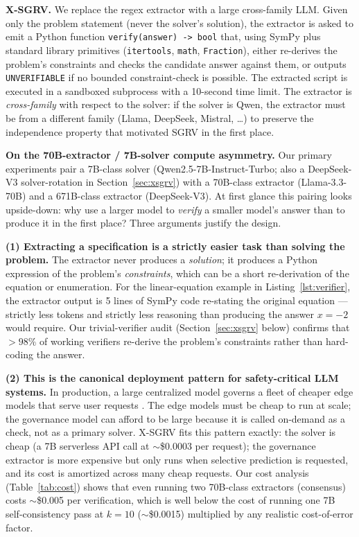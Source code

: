 \documentclass{article}
\begin{document}
\textbf{X-SGRV.} We replace the regex extractor with a large cross-family LLM. Given only the problem statement (never the solver's solution), the extractor is asked to emit a Python function \texttt{verify(answer) -> bool} that, using SymPy plus standard library primitives (\texttt{itertools}, \texttt{math}, \texttt{Fraction}), either re-derives the problem's constraints and checks the candidate answer against them, or outputs \texttt{UNVERIFIABLE} if no bounded constraint-check is possible. The extracted script is executed in a sandboxed subprocess with a 10-second time limit. The extractor is \emph{cross-family} with respect to the solver: if the solver is Qwen, the extractor must be from a different family (Llama, DeepSeek, Mistral, \ldots) to preserve the independence property that motivated SGRV in the first place.

\textbf{On the 70B-extractor / 7B-solver compute asymmetry.} Our primary experiments pair a 7B-class solver (Qwen2.5-7B-Instruct-Turbo; also a DeepSeek-V3 solver-rotation in Section~\ref{sec:xsgrv}) with a 70B-class extractor (Llama-3.3-70B) and a 671B-class extractor (DeepSeek-V3). At first glance this pairing looks upside-down: why use a larger model to \emph{verify} a smaller model's answer than to produce it in the first place? Three arguments justify the design.

\textbf{(1) Extracting a specification is a strictly easier task than solving the problem.} The extractor never produces a \emph{solution}; it produces a Python expression of the problem's \emph{constraints}, which can be a short re-derivation of the equation or enumeration. For the linear-equation example in Listing~\ref{lst:verifier}, the extractor output is 5 lines of SymPy code re-stating the original equation --- strictly less tokens and strictly less reasoning than producing the answer $x{=}-2$ would require. Our trivial-verifier audit (Section~\ref{sec:xsgrv} below) confirms that $>98\%$ of working verifiers re-derive the problem's constraints rather than hard-coding the answer.

\textbf{(2) This is the canonical deployment pattern for safety-critical LLM systems.} In production, a large centralized model governs a fleet of cheaper edge models that serve user requests \citep{xiong2024llmuncertainty, ste2024}. The edge models must be cheap to run at scale; the governance model can afford to be large because it is called on-demand as a check, not as a primary solver. X-SGRV fits this pattern exactly: the solver is cheap (a 7B serverless API call at $\sim$\$0.0003 per request); the governance extractor is more expensive but only runs when selective prediction is requested, and its cost is amortized across many cheap requests. Our cost analysis (Table~\ref{tab:cost}) shows that even running two 70B-class extractors (consensus) costs $\sim$\$0.005 per verification, which is well below the cost of running one 7B self-consistency pass at $k{=}10$ ($\sim$\$0.0015) multiplied by any realistic cost-of-error factor.
\end{document}
